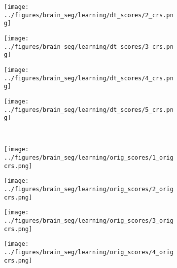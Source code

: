 \begin{figure}[h!]
\begin{subfigure}{0.16\textwidth}
		\label{fig:6}
	\end{subfigure}
	\begin{subfigure}{0.16\textwidth}
		\centering
		\texttt{[image: ../figures/brain\_seg/learning/dt\_scores/2\_crs.png]}
		\label{fig:7}
	\end{subfigure}
	\begin{subfigure}{0.16\textwidth}
		\centering
		\texttt{[image: ../figures/brain\_seg/learning/dt\_scores/3\_crs.png]}
		\label{fig:8}
	\end{subfigure}
	\begin{subfigure}{0.16\textwidth}
		\centering
		\texttt{[image: ../figures/brain\_seg/learning/dt\_scores/4\_crs.png]}
		\label{fig:9}
	\end{subfigure}
	\begin{subfigure}{0.16\textwidth}
		\centering
		\texttt{[image: ../figures/brain\_seg/learning/dt\_scores/5\_crs.png]}
		\label{fig:10}
	\end{subfigure}
	\\
	\vspace{-0.35cm}
		\begin{subfigure}[b]{0.03\textwidth} %
		\centering
	\end{subfigure}
	\hspace{0.1cm}
	\begin{subfigure}{0.16\textwidth}
		\centering
		\texttt{[image: ../figures/brain\_seg/learning/orig\_scores/1\_origcrs.png]}
		\label{fig:6}
	\end{subfigure}
	\begin{subfigure}{0.16\textwidth}
		\centering
		\texttt{[image: ../figures/brain\_seg/learning/orig\_scores/2\_origcrs.png]}
		\label{fig:7}
	\end{subfigure}
	\begin{subfigure}{0.16\textwidth}
		\centering
		\texttt{[image: ../figures/brain\_seg/learning/orig\_scores/3\_origcrs.png]}
		\label{fig:8}
	\end{subfigure}
	\begin{subfigure}{0.16\textwidth}
		\centering
		\texttt{[image: ../figures/brain\_seg/learning/orig\_scores/4\_origcrs.png]}
		\label{fig:9}
	\end{subfigure}
	\begin{subfigure}{0.16\textwidth}

\end{subfigure}
\end{figure}
